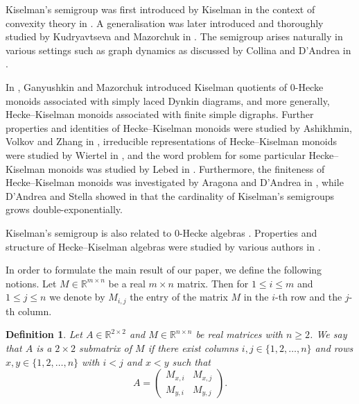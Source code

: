 \documentclass[pdflatex,sn-mathphys-num]{sn-jnl}%
\theoremstyle{thmstyleone}%
\theoremstyle{thmstyletwo}%
\theoremstyle{thmstylethree}%
\newtheorem{definition}{Definition}%
\begin{document}
Kiselman's semigroup was first introduced by Kiselman in the context of convexity theory in \cite{Kiselman}. A generalisation was later introduced and thoroughly studied by 
Kudryavtseva and Mazorchuk in \cite{GK}. The semigroup arises naturally in various settings such as graph dynamics as discussed by Collina and D’Andrea in \cite{Graphs}.

In \cite{ganyushkin11}, Ganyushkin and Mazorchuk introduced Kiselman quotients of 0-Hecke monoids associated with simply laced Dynkin diagrams, and
more generally, Hecke--Kiselman monoids associated with finite simple digraphs. Further properties and identities of Hecke--Kiselman monoids were studied by Ashikhmin, Volkov and Zhang in \cite{Ashikhmin15},  
irreducible representations of Hecke--Kiselman monoids were studied by Wiertel in \cite{wiertel22},
and the word problem for some particular Hecke--Kiselman monoids was studied by Lebed in \cite{Lebed2025}. 
Furthermore, the finiteness of Hecke--Kiselman monoids was investigated by Aragona and D’Andrea in 
\cite{aragona13}, while D’Andrea and Stella showed in \cite{dandrea23} that the cardinality of Kiselman's semigroups grows double-exponentially. 
 
Kiselman's semigroup is also related to 0-Hecke algebras \cite{norton79}. Properties and structure of Hecke--Kiselman algebras were studied by various authors in \cite{okninski20, okninski21, wiertel23, Mecel2019}.  

In order to formulate the main result of our paper, we define the following notions.
Let $M \in \mathbb{R}^{m \times n}$ be a real $m \times n$ matrix. Then for $1 \leq i \leq m$ and $1 \leq j \leq n$ we denote by $M_{i, j}$ the entry of the matrix $M$ in the $i$-th row and the $j$-th column. 
\begin{definition}
   Let $A \in \mathbb{R}^{2 \times 2}$ and $M \in \mathbb{R}^{n \times n}$ be real matrices with $n \geq 2$. We say that $A$ is a \emph{$2 \times 2$ submatrix} of 
   $M$ if there exist columns $i, j \in \{1, 2, \dots, n\}$ and rows $x, y \in \{1, 2, \dots, n\}$ with $i < j$ and $x < y$ such that 
   \[
      A = 
      \begin{pmatrix}
         M_{x, i} & M_{x, j} \\
         M_{y, i} & M_{y, j}
      \end{pmatrix}.
   \]
\end{definition}
\end{document}
